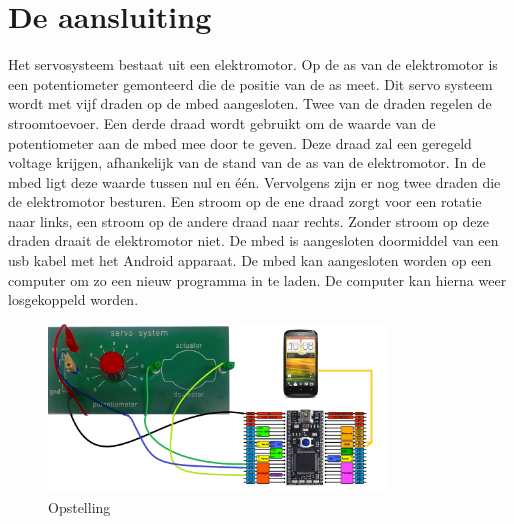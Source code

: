 \documentclass[a4paper]{article}
\begin{document}
	\section{De aansluiting}
		Het servosysteem bestaat uit een elektromotor. Op de as van de elektromotor is een potentiometer gemonteerd die de positie van de as meet. Dit servo systeem wordt met vijf draden op de mbed aangesloten. Twee van de draden regelen de stroomtoevoer. Een derde draad wordt gebruikt om de waarde van de potentiometer aan de mbed mee door te geven. Deze draad zal een geregeld voltage krijgen, afhankelijk van de stand van de as van de elektromotor. In de mbed ligt deze waarde tussen nul en \'e\'en. Vervolgens zijn er nog twee draden die de elektromotor besturen. Een stroom op de ene draad zorgt voor een rotatie naar links, een stroom op de andere draad naar rechts. Zonder stroom op deze draden draait de elektromotor niet. De mbed is aangesloten doormiddel van een usb kabel met het Android apparaat. De mbed kan aangesloten worden op een computer om zo een nieuw programma in te laden. De computer kan hierna weer losgekoppeld worden.
	\begin{figure}[h]
		\centering
		\includegraphics[width=0.8\textwidth]{imgs/opstelling.png}
		\caption{Opstelling}
		\label{fig:opstelling}
	\end{figure}
\end{document}
